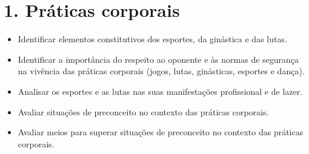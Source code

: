 \chapter{1. Práticas corporais}



\begin{itemize}
\item
  Identificar elementos constitutivos dos esportes, da ginástica e das
  lutas.
\item
  Identificar a importância do respeito ao oponente e às normas de
  segurança na vivência das práticas corporais (jogos, lutas,
  ginásticas, esportes e dança).
\item
  Analisar os esportes e as lutas nas suas manifestações profissional e
  de lazer.
\item
  Avaliar situações de preconceito no contexto das práticas corporais.
\item
  Avaliar meios para superar situações de preconceito no contexto das
  práticas corporais.
\end{itemize}


